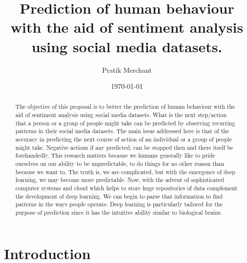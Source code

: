 \documentclass[aps,floatfix,prd,showpacs]{revtex4}
\begin{document}
\title{Prediction of human behaviour with the aid of sentiment analysis using social media datasets.}
\author{Pratik Merchant}

\date{\today}

\begin{abstract}
The objective of this proposal is to better the prediction of human behaviour with the aid of sentiment analysis using social media datasets. What is the next step/action that a person or a group of people might take can be predicted by observing recurring patterns in their social media datasets. 
The main issue addressed here is that of the accuracy in predicting the next course of action of an individual or a group of people might take. Negative actions if any predicted, can be stopped then and there itself be forehandedly. This research matters because we humans generally like to pride ourselves on our ability to be unpredictable, to do things for no other reason than because we want to. The truth is, we are complicated, but with the emergence of deep learning, we may become more predictable. Now, with the advent of sophisticated computer systems and cloud which helps to store huge repositories of data complement the development of deep learning. We can begin to parse that information to find patterns in the ways people operate. Deep learning is particularly tailored for the purpose of prediction since it has the intuitive ability similar to biological brains. 

\end{abstract}
\maketitle

\section{Introduction}
\end{document}
